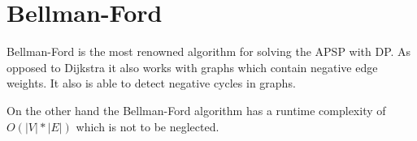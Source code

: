 \chapter{Bellman-Ford}
Bellman-Ford is the most renowned algorithm for solving the \ac{APSP} with \ac{DP}. As opposed to Dijkstra it also works with graphs which contain negative edge weights. It also is able to detect negative cycles in graphs. \cite{Kiruthika.2012, Tamimi.2015}

On the other hand the Bellman-Ford algorithm has a runtime complexity of $O(|V|*|E|)$ which is not to be neglected. \cite{Kiruthika.2012, Tamimi.2015}